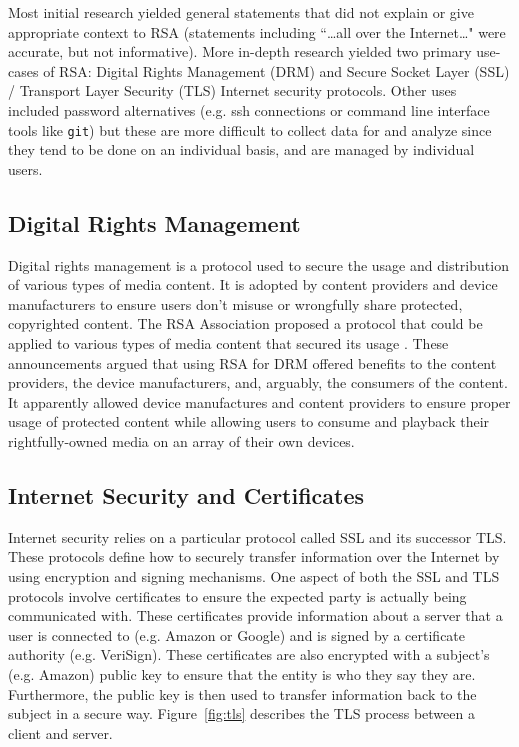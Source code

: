 \documentclass[smallextended]{svjour3}       %
\begin{document}
Most initial research yielded general statements that did not explain or give
appropriate context to RSA (statements including ``\dots all over the
Internet\dots" were accurate, but not informative). More in-depth research
yielded two primary use-cases of RSA: Digital Rights Management (DRM) and
Secure Socket Layer (SSL) / Transport Layer Security (TLS) Internet
security protocols. Other uses included password alternatives (e.g. ssh
connections or command line interface tools like \texttt{git}) but these are
more difficult to collect data for and analyze since they tend to be done on
an individual basis, and are managed by individual users.

\subsection{Digital Rights Management}
\label{subsec:drm}
Digital rights management is a protocol used to secure the usage and
distribution of various types of media content. It is adopted by content
providers and device manufacturers to ensure users don't misuse or wrongfully 
share protected, copyrighted content.
The RSA Association proposed a protocol that could be applied to various types
of media content that secured its usage
\citep{rsa2004announces,rsa2004supports}. These announcements argued that
using RSA for DRM offered benefits to the content providers, the device
manufacturers, and, arguably, the consumers of the content. It apparently
allowed device manufactures and content providers to ensure proper usage of
protected content while allowing users to consume and playback their
rightfully-owned media on an array of their own devices.

\subsection{Internet Security and Certificates}
\label{subsec:netsec}
Internet security relies on a particular protocol called SSL and its successor
TLS. These protocols define how to securely transfer information over the
Internet by using encryption and signing mechanisms. One aspect of both the SSL
and TLS protocols involve certificates to ensure the expected party is
actually being communicated with. These certificates provide information
about a server that a user is connected to (e.g. Amazon or Google)
and is signed by a certificate authority (e.g. VeriSign). These certificates
are also encrypted with a subject's (e.g. Amazon) public key to ensure that
the entity is who they say they are. Furthermore, the public key is then used 
to transfer information back to the subject in a secure way.
Figure~\ref{fig:tls} describes the TLS process between a client and server. 
\end{document}
